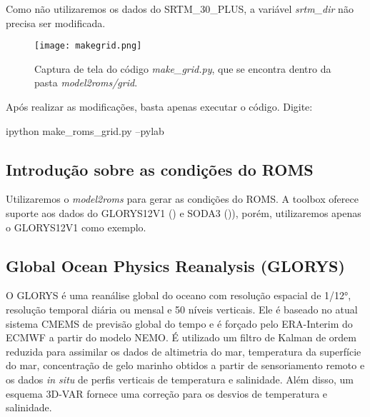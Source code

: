 \begin{tcolorbox}[enhanced,
    grow to left by   = 0cm,
    grow to right by  = 0cm,
    enlarge top by    = 0cm,
    enlarge bottom by = 0cm,
    tcbox raise base,
    boxrule           = 1.0pt,
    left              = 18mm,
    colframe          = red!50!black,coltext=red!25!black,colback=red!10!white,
    overlay           = {\begin{tcbclipinterior}\fill[red!75!blue!50!white] (frame.south west)
      rectangle node[text=white,font=\sffamily\bfseries\footnotesize,rotate=0] {ATENÇÃO} ([xshift=18mm]frame.north west);\end{tcbclipinterior}}]
  Como não utilizaremos os dados do SRTM\_30\_PLUS, a variável \textit{srtm\_dir} não precisa ser modificada.
\end{tcolorbox}
\bigskip

\begin{figure}[H]
    \centering
    \texttt{[image: makegrid.png]}
    \caption{Captura de tela do código \textit{make\_grid.py}, que se encontra dentro da pasta \textit{model2roms/grid}.}
    \label{fazgrade}
\end{figure}
\bigskip

\noindent Após realizar as modificações, basta apenas executar o código. Digite:
\bigskip

\begin{bashcode}
ipython make_roms_grid.py --pylab
\end{bashcode}
\bigskip

\subsection{Introdução sobre as condições do ROMS}
\bigskip

\noindent Utilizaremos o \textit{model2roms} para gerar as condições do ROMS. A toolbox oferece suporte aos dados do GLORYS12V1 (\cite{Fernandez2018}) e SODA3 ()\cite{Carton2018}), porém, utilizaremos apenas o GLORYS12V1 como exemplo.

\subsection{Global Ocean Physics Reanalysis (GLORYS)}
\bigskip

\noindent  O GLORYS é uma reanálise global do oceano com resolução espacial de 1/12°, resolução temporal diária ou mensal e 50 níveis verticais. Ele é baseado no atual sistema CMEMS de previsão global do tempo e é forçado pelo ERA-Interim do ECMWF a partir do modelo NEMO. É utilizado um filtro de Kalman de ordem reduzida para assimilar os dados de altimetria do mar, temperatura da superfície do mar, concentração de gelo marinho obtidos a partir de sensoriamento remoto e os dados \textit{in situ} de perfis verticais de temperatura e salinidade. Além disso, um esquema 3D-VAR fornece uma correção para os desvios de temperatura e salinidade. 
\bigskip


